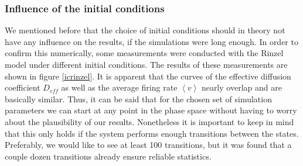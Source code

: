 \documentclass[12pt,a4paper]{article}
\begin{document}
\subsubsection{Influence of the initial conditions}
We mentioned before that the choice of initial conditions should in theory not have any influence on the results, if the simulations were long enough. In order to confirm this numerically, some measurements were conducted with the Rinzel model under different initial conditions. The results of these measurements are shown in figure \ref{icrinzel}. It is apparent that the curves of the effective diffusion coefficient $D_{eff}$ as well as the average firing rate $\left<v\right>$ nearly overlap and are basically similar. Thus, it can be said that for the chosen set of simulation parameters we can start at any point in the phase space without having to worry about the plausibility of our results. Nonetheless it is important to keep in mind that this only holds if the system performs enough transitions between the states. Preferably, we would like to see at least 100 transitions, but it was found that a couple dozen transitions already ensure reliable statistics.
\end{document}
